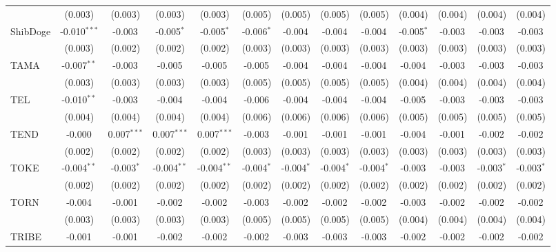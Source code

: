 \begin{table}[!htbp]
\begin{tabular}{@{\extracolsep{5pt}}lcccccccccccc}
  & (0.003) & (0.003) & (0.003) & (0.003) & (0.005) & (0.005) & (0.005) & (0.005) & (0.004) & (0.004) & (0.004) & (0.004) \\
 ShibDoge & -0.010$^{***}$ & -0.003$^{}$ & -0.005$^{*}$ & -0.005$^{*}$ & -0.006$^{*}$ & -0.004$^{}$ & -0.004$^{}$ & -0.004$^{}$ & -0.005$^{*}$ & -0.003$^{}$ & -0.003$^{}$ & -0.003$^{}$ \\
  & (0.003) & (0.002) & (0.002) & (0.002) & (0.003) & (0.003) & (0.003) & (0.003) & (0.003) & (0.003) & (0.003) & (0.003) \\
 TAMA & -0.007$^{**}$ & -0.003$^{}$ & -0.005$^{}$ & -0.005$^{}$ & -0.005$^{}$ & -0.004$^{}$ & -0.004$^{}$ & -0.004$^{}$ & -0.004$^{}$ & -0.003$^{}$ & -0.003$^{}$ & -0.003$^{}$ \\
  & (0.003) & (0.003) & (0.003) & (0.003) & (0.005) & (0.005) & (0.005) & (0.005) & (0.004) & (0.004) & (0.004) & (0.004) \\
 TEL & -0.010$^{**}$ & -0.003$^{}$ & -0.004$^{}$ & -0.004$^{}$ & -0.006$^{}$ & -0.004$^{}$ & -0.004$^{}$ & -0.004$^{}$ & -0.005$^{}$ & -0.003$^{}$ & -0.003$^{}$ & -0.003$^{}$ \\
  & (0.004) & (0.004) & (0.004) & (0.004) & (0.006) & (0.006) & (0.006) & (0.006) & (0.005) & (0.005) & (0.005) & (0.005) \\
 TEND & -0.000$^{}$ & 0.007$^{***}$ & 0.007$^{***}$ & 0.007$^{***}$ & -0.003$^{}$ & -0.001$^{}$ & -0.001$^{}$ & -0.001$^{}$ & -0.004$^{}$ & -0.001$^{}$ & -0.002$^{}$ & -0.002$^{}$ \\
  & (0.002) & (0.002) & (0.002) & (0.002) & (0.003) & (0.003) & (0.003) & (0.003) & (0.003) & (0.003) & (0.003) & (0.003) \\
 TOKE & -0.004$^{**}$ & -0.003$^{*}$ & -0.004$^{**}$ & -0.004$^{**}$ & -0.004$^{*}$ & -0.004$^{*}$ & -0.004$^{*}$ & -0.004$^{*}$ & -0.003$^{}$ & -0.003$^{}$ & -0.003$^{*}$ & -0.003$^{*}$ \\
  & (0.002) & (0.002) & (0.002) & (0.002) & (0.002) & (0.002) & (0.002) & (0.002) & (0.002) & (0.002) & (0.002) & (0.002) \\
 TORN & -0.004$^{}$ & -0.001$^{}$ & -0.002$^{}$ & -0.002$^{}$ & -0.003$^{}$ & -0.002$^{}$ & -0.002$^{}$ & -0.002$^{}$ & -0.003$^{}$ & -0.002$^{}$ & -0.002$^{}$ & -0.002$^{}$ \\
  & (0.003) & (0.003) & (0.003) & (0.003) & (0.005) & (0.005) & (0.005) & (0.005) & (0.004) & (0.004) & (0.004) & (0.004) \\
 TRIBE & -0.001$^{}$ & -0.001$^{}$ & -0.002$^{}$ & -0.002$^{}$ & -0.002$^{}$ & -0.003$^{}$ & -0.003$^{}$ & -0.003$^{}$ & -0.002$^{}$ & -0.002$^{}$ & -0.002$^{}$ & -0.002$^{}$ \\

\end{tabular}
\end{table}
